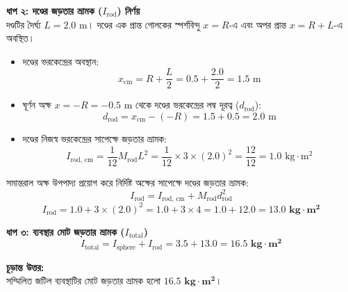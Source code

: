\documentclass[12pt, a4paper]{article}
\begin{document}
\begin{tcolorbox}[solutionbox={সমাধান (Solution)}]
\begin{center}
\begin{tikzpicture}[>=Stealth, scale=1.1, text=black]
\end{tikzpicture}
\end{center}
\vspace{1em}

\vspace{0.5em}
\noindent
\textbf{ধাপ ২: দণ্ডের জড়তার ভ্রামক ($I_{\text{rod}}$) নির্ণয়} \\
দণ্ডটির দৈর্ঘ্য $L = 2.0\text{ m}$। দণ্ডের এক প্রান্ত গোলকের স্পর্শবিন্দু $x = R$-এ এবং অপর প্রান্ত $x = R+L$-এ অবস্থিত।
\begin{itemize}[leftmargin=*, parsep=0.3ex]
    \item দণ্ডের ভরকেন্দ্রের অবস্থান: 
    $$x_{\text{cm}} = R + \frac{L}{2} = 0.5 + \frac{2.0}{2} = 1.5\text{ m}$$
    \item ঘূর্ণন অক্ষ $x = -R = -0.5\text{ m}$ থেকে দণ্ডের ভরকেন্দ্রের লম্ব দূরত্ব ($d_{\text{rod}}$): 
    $$d_{\text{rod}} = x_{\text{cm}} - (-R) = 1.5 + 0.5 = 2.0\text{ m}$$
    \item দণ্ডের নিজস্ব ভরকেন্দ্রের সাপেক্ষে জড়তার ভ্রামক: 
    $$I_{\text{rod, cm}} = \frac{1}{12} M_{\text{rod}} L^2 = \frac{1}{12} \times 3 \times (2.0)^2 = \frac{12}{12} = 1.0\text{ kg}\cdot\text{m}^2$$
\end{itemize}

সমান্তরাল অক্ষ উপপাদ্য প্রয়োগ করে নির্দিষ্ট অক্ষের সাপেক্ষে দণ্ডের জড়তার ভ্রামক:
$$I_{\text{rod}} = I_{\text{rod, cm}} + M_{\text{rod}} d_{\text{rod}}^2$$ 
$$I_{\text{rod}} = 1.0 + 3 \times (2.0)^2 = 1.0 + 3 \times 4 = 1.0 + 12.0 = \mathbf{13.0\text{ kg}\cdot\text{m}^2}$$

\vspace{0.5em}
\noindent
\textbf{ধাপ ৩: ব্যবস্থার মোট জড়তার ভ্রামক ($I_{\text{total}}$)} \\
$$I_{\text{total}} = I_{\text{sphere}} + I_{\text{rod}} = 3.5 + 13.0 = \mathbf{16.5\text{ kg}\cdot\text{m}^2}$$

\vspace{1em}
\begin{tcolorbox}[answerbox]
\textbf{চূড়ান্ত উত্তর:} \\
সম্মিলিত জটিল ব্যবস্থাটির মোট জড়তার ভ্রামক হলো $\mathbf{16.5\text{ kg}\cdot\text{m}^2}$।
\end{tcolorbox}
\end{tcolorbox}
\end{document}
